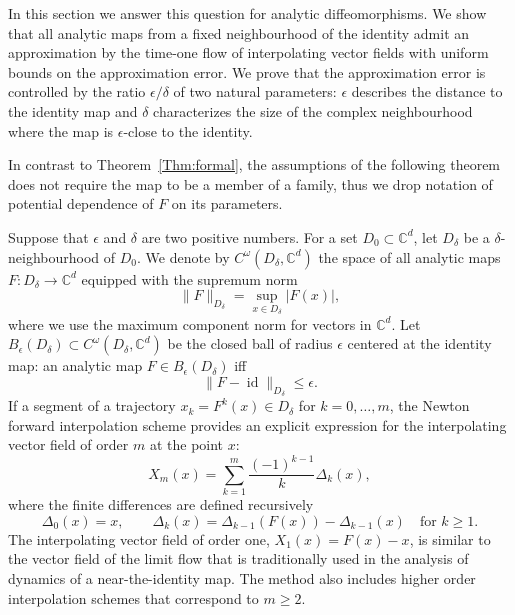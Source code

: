 \documentclass[a4paper,12pt]{article}
\newcommand{\C}{\mathbb{C}}
\begin{document}
In this section we answer this question 
for analytic diffeomorphisms. 
We show that all analytic maps from a fixed neighbourhood 
of the identity admit an approximation by
the time-one flow of interpolating vector fields with uniform bounds on the approximation error.
We prove that the approximation error is controlled by the ratio $\epsilon/\delta$ of two natural parameters:  $\epsilon$ describes the distance to the identity map
and $\delta$ characterizes the size of the complex neighbourhood where the map
is $\epsilon$-close to the identity. 

In contrast to Theorem~\ref{Thm:formal},
 the assumptions of the following theorem does not require
the map to be a member of a family, thus we drop notation of  potential dependence of $F$ on its parameters.

Suppose that $\epsilon$ and $\delta$ are two positive numbers. 
For a set $D_0\subset \C^d$, let  $D_\delta$ be a  $\delta$-neighbourhood 
of $D_0$. We  denote by $C^\omega(D_\delta,\C^d)$  the space of all
analytic maps $F:D_\delta\to \C^d$ equipped with 
the supremum norm
\[
\|F\|_{D_\delta}=\sup_{x\in D_\delta}|F(x)|,
\]
where we use the maximum component norm for vectors in $\C^d$.
Let $B_{\epsilon}(D_\delta)\subset C^\omega(D_\delta,\C^d)$ be the closed ball of radius $\epsilon$ centered
at the identity map:  an analytic map $F\in B_{\epsilon}(D_\delta)$ iff
\begin{equation}\label{Eq:f-xi}
\|F-\operatorname{id}\|_{D_\delta}\le \epsilon.
\end{equation}
If a segment of a trajectory $x_k=F^k(x)\in D_{\delta}$ for $k=0,\dots,m$,  
the Newton forward interpolation scheme provides an explicit 
expression for the interpolating vector field of order $m$ at the point $x$:
\begin{equation}\label{Eq:interpol_VF}
	X_m(x)=\sum_{k=1}^m\frac{(-1)^{k-1}}{k}\Delta_k(x),
\end{equation}
where the finite differences are defined recursively
\begin{equation}\label{Eq:finite-diff}
	\Delta_0(x)=x,
	\qquad 
	\Delta_{k}(x)=\Delta_{k-1}(F(x))-\Delta_{k-1}(x)
	\quad\text{for  $k\ge 1$}.
\end{equation}
The interpolating vector field of order one, $X_1(x)=F(x)-x$,
is similar to the vector field of the limit flow that is
traditionally used in the analysis of dynamics of a near-the-identity map.
The method also includes  higher order interpolation schemes that correspond to $m\ge2$. 
\end{document}
